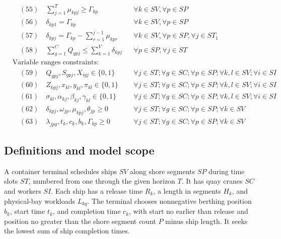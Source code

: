 \documentclass[10pt]{article}
\begin{document}
\begin{align*}
& \quad (55) \quad \sum_{j=1}^{T} \mu_{kpj} \ge \Gamma_{kp} && \forall k \in SV, \forall p \in SP \\
& \quad (56) \quad \delta_{kp1} = \Gamma_{kp} && \forall k \in SV, \forall p \in SP \\
& \quad (57) \quad \delta_{kpj} = \Gamma_{kp} - \sum_{r=1}^{j-1} \mu_{kpr} && \forall k \in SV, \forall p \in SP, \forall j \in ST_1 \\
& \quad (58) \quad \sum_{g=1}^{C} Q_{gpj} \le \sum_{k=1}^{V} \delta_{kpj} && \forall p \in SP, \forall j \in ST \\
& \text{Variable ranges constraints:} \\
& \quad (59) \quad Q_{gpj}, S_{gpj}, X_{igj} \in \{0, 1\} && \forall j \in ST; \forall g \in SC; \forall p \in SP; \forall k, l \in SV; \forall i \in SI \\
& \quad (60) \quad Z_{kpj}, x_{kl}, y_{kl}, \pi_{kl} \in \{0, 1\} && \forall j \in ST; \forall g \in SC; \forall p \in SP; \forall k, l \in SV; \forall i \in SI \\
& \quad (61) \quad \sigma_{kl}, \alpha_{kj}, \beta_{kj}, \gamma_{kl} \in \{0, 1\} && \forall j \in ST; \forall g \in SC; \forall p \in SP; \forall k, l \in SV; \forall i \in SI \\
& \quad (62) \quad \delta_{kpj}, \omega_{jp}, \mu_{kpj}, \theta_{jp} \ge 0 && \forall j \in ST; \forall g \in SC; \forall p \in SP; \forall k \in SV \\
& \quad (63) \quad \lambda_{jpg}, t_k, c_k, b_k, \Gamma_{kp} \ge 0 && \forall j \in ST; \forall g \in SC; \forall p \in SP; \forall k \in SV
\end{align*}

\subsection*{Definitions and model scope}
A container terminal schedules ships $SV$ along shore segments $SP$ during time slots $ST$, numbered from one through the given horizon $T$. It has quay cranes $SC$ and workers $SI$. Each ship has a release time $R_k$, a length in segments $H_k$, and physical-bay workloads $L_{kq}$. The terminal chooses nonnegative berthing position $b_k$, start time $t_k$, and completion time $c_k$, with start no earlier than release and position no greater than the shore segment count $P$ minus ship length. It seeks the lowest sum of ship completion times.
\end{document}
